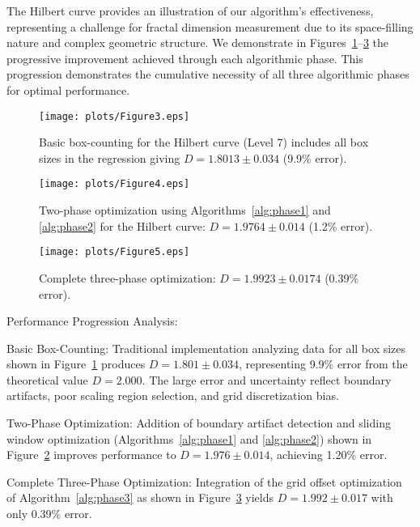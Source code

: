 \documentclass[preprint,12pt]{elsarticle}
\def\textbf#1{#1}%
\begin{document}
The Hilbert curve provides an illustration of our algorithm's effectiveness, representing a challenge for fractal dimension measurement due to its space-filling nature and complex geometric structure. We demonstrate in Figures~\ref{fig:hilbert_basic}--\ref{fig:hilbert_three_phase} the progressive improvement achieved through each algorithmic phase. This progression demonstrates the cumulative necessity of all three algorithmic phases for optimal performance.

\begin{figure}[tbp]
\centering
\texttt{[image: plots/Figure3.eps]}
\caption{Basic box-counting for the Hilbert curve (Level 7) includes all box sizes in the regression giving $D = 1.8013 \pm 0.034$ (9.9\% error).}
\label{fig:hilbert_basic}
\end{figure}

\begin{figure}[H]
\centering
\texttt{[image: plots/Figure4.eps]}
\caption{Two-phase optimization using Algorithms~\ref{alg:phase1} and \ref{alg:phase2} for the  Hilbert curve: $D = 1.9764 \pm 0.014$ (1.2\% error).}
\label{fig:hilbert_two_phase}
\end{figure}

\begin{figure}[H]
\centering
\texttt{[image: plots/Figure5.eps]}
\caption{Complete three-phase optimization: $D = 1.9923 \pm 0.0174$ (0.39\% error).}
\label{fig:hilbert_three_phase}
\end{figure}

\textbf{Performance Progression Analysis}:

\textbf{Basic Box-Counting}: Traditional implementation analyzing data for all box sizes shown in Figure~\ref{fig:hilbert_basic} produces $D = 1.801 \pm 0.034$, representing 9.9\% error from the theoretical value $D = 2.000$. The large error and uncertainty reflect boundary artifacts, poor scaling region selection, and grid discretization bias.

\textbf{Two-Phase Optimization}: Addition of boundary artifact detection and sliding window optimization (Algorithms~\ref{alg:phase1} and \ref{alg:phase2}) shown in Figure~\ref{fig:hilbert_two_phase} improves performance to $D = 1.976 \pm 0.014$, achieving 1.20\% error.

\textbf{Complete Three-Phase Optimization}: Integration of the grid offset optimization of Algorithm~\ref{alg:phase3} as shown in Figure~\ref{fig:hilbert_three_phase} yields $D = 1.992 \pm 0.017$ with only 0.39\% error.
\end{document}
